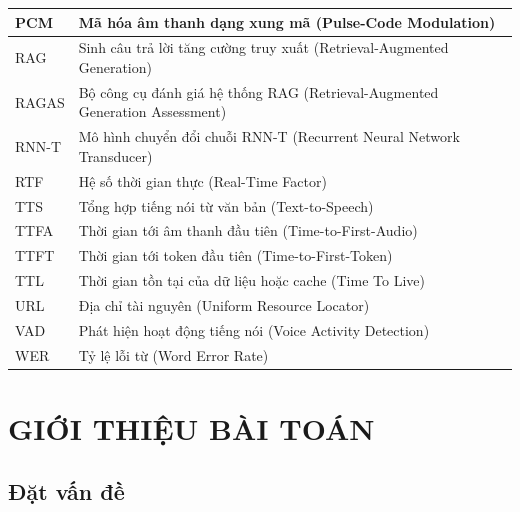 \documentclass[a4paper,13pt,twoside]{report}
\begin{document}
\begin{longtable}{|p{2.6cm}|p{11.2cm}|}
    \hline
    PCM                & Mã hóa âm thanh dạng xung mã (Pulse-Code Modulation)                              \\
    \hline
    RAG                & Sinh câu trả lời tăng cường truy xuất (Retrieval-Augmented Generation)            \\
    \hline
    RAGAS              & Bộ công cụ đánh giá hệ thống RAG (Retrieval-Augmented Generation Assessment)      \\
    \hline
    RNN-T              & Mô hình chuyển đổi chuỗi RNN-T (Recurrent Neural Network Transducer)              \\
    \hline
    RTF                & Hệ số thời gian thực (Real-Time Factor)                                           \\
    \hline
    TTS                & Tổng hợp tiếng nói từ văn bản (Text-to-Speech)                                    \\
    \hline
    TTFA               & Thời gian tới âm thanh đầu tiên (Time-to-First-Audio)                             \\
    \hline
    TTFT               & Thời gian tới token đầu tiên (Time-to-First-Token)                                \\
    \hline
    TTL                & Thời gian tồn tại của dữ liệu hoặc cache (Time To Live)                           \\
    \hline
    URL                & Địa chỉ tài nguyên (Uniform Resource Locator)                                     \\
    \hline
    VAD                & Phát hiện hoạt động tiếng nói (Voice Activity Detection)                          \\
    \hline
    WER                & Tỷ lệ lỗi từ (Word Error Rate)                                                    \\
    \hline
\end{longtable}
\endgroup
\newpage


\chapter{GIỚI THIỆU BÀI TOÁN}

\section{Đặt vấn đề}
\end{document}
